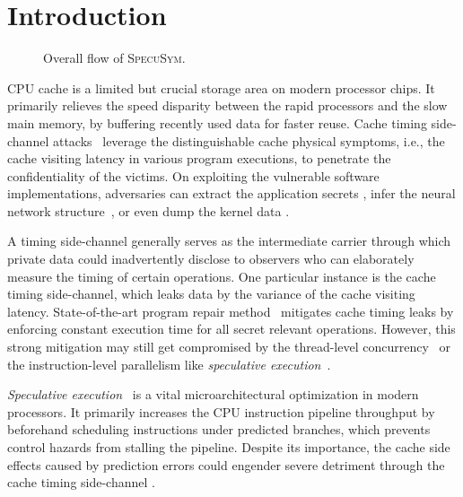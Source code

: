 \documentclass[sigconf]{acmart}
\begin{document}
\section{Introduction}
\label{sec:intro}


\begin{figure}[htb]
  \centering
  \scalebox{1.0}{}
  \caption{Overall flow of \textsc{SpecuSym}.}
  \label{fig:overall_flow}
	\vspace{-2ex}
\end{figure}


CPU cache is a limited but crucial storage area on modern processor chips. 
It primarily relieves the speed disparity between the rapid processors and 
the slow main memory, by buffering recently used data for faster reuse. Cache 
timing side-channel attacks~\cite{Kocher96,DhemKLMQW98} leverage the 
distinguishable cache physical symptoms, i.e., the cache visiting latency 
in various program executions, to penetrate the confidentiality of the victims. 
On exploiting the vulnerable software implementations, adversaries can extract 
the application secrets
\cite{OsvikST06,TromerOS10,GullaschBK11,CGM16}, infer the neural network 
structure~\cite{YanFT18,HuLDLXJDLSX18,HongDKLRKDD18,DudduSRB18}, or even dump 
the kernel data
\cite{HundWH13,LippSGPHFHMKGYH18,KocherGGHHLMPSY19,WeisseVMGKPSSWY18}.


A timing side-channel generally serves as the intermediate carrier through
which private data could inadvertently disclose to observers who can 
elaborately measure the timing of certain operations. One particular instance 
is the cache timing side-channel, which leaks data by the variance of the 
cache visiting latency. State-of-the-art program repair method~\cite{WuGSW18} 
mitigates cache timing leaks by enforcing constant execution time for all 
secret relevant operations. However, this strong mitigation may still get 
compromised by the thread-level concurrency~\cite{GuoWW18} or the 
instruction-level parallelism like \textit{speculative execution}~\cite{kimuraKT1996}.


\textit{Speculative execution}~\cite{kimuraKT1996} is a vital microarchitectural
optimization in modern processors. It primarily increases the CPU instruction 
pipeline throughput by beforehand scheduling instructions under predicted branches, 
which prevents control hazards from stalling the pipeline. Despite its importance, 
the cache side effects caused by prediction errors could engender severe detriment 
through the cache timing side-channel
\cite{KocherGGHHLMPSY19,BulckMWGKPSWYS18,WeisseVMGKPSSWY18,IslamMBKGES19}. 
\end{document}
